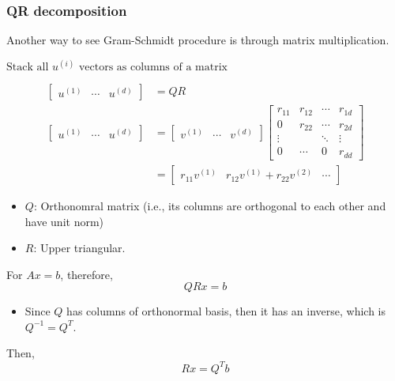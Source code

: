     \subsubsection{QR decomposition}
    Another way to see Gram-Schmidt procedure is through matrix multiplication.
    \begin{definition}
        $\text{Stack all } u^{(i)} \text{ vectors as columns of a matrix}$

        \begin{align*}
            \begin{bmatrix}
            u^{(1)} & \cdots & u^{(d)}
            \end{bmatrix}
            &= QR \\
            \begin{bmatrix}
            u^{(1)} & \cdots & u^{(d)}
            \end{bmatrix}
            &=
            \begin{bmatrix}
            v^{(1)} & \cdots & v^{(d)}
            \end{bmatrix}
            \begin{bmatrix}
            r_{11} & r_{12} & \cdots & r_{1d} \\
            0      & r_{22} & \cdots & r_{2d} \\
            \vdots &        & \ddots & \vdots \\
            0      & \cdots & 0      & r_{dd}
            \end{bmatrix} \\
            &=
            \begin{bmatrix}
            r_{11}v^{(1)} & r_{12}v^{(1)} + r_{22}v^{(2)} & \cdots
            \end{bmatrix}
        \end{align*}        

        \begin{itemize}
            \item \( Q \): Orthonomral matrix (i.e., its columns are orthogonal to each other and have unit norm) 
            \item \( R \): Upper triangular.
        \end{itemize}        
    \end{definition}
    
    \begin{intuition}
        For $Ax=b$, therefore, 
        \begin{equation*}
            QRx=b
        \end{equation*}
        \begin{itemize}
            \item Since $Q$ has columns of orthonormal basis, then it has an inverse, which is $Q^{-1} = Q^T$. 
        \end{itemize}
        \vspace{1em}

        Then, 
        \begin{equation*}
            Rx=Q^T b
        \end{equation*}
    \end{intuition}

